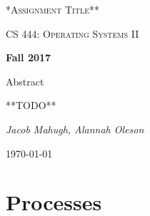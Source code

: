 \documentclass[letterpaper,10pt,titlepage]{article}
\begin{document}
\begin{titlepage}
	\centering
	\vspace*{4cm}
	{\scshape\huge **Assignment Title**\par}
	\vspace{1cm}
	{\scshape\LARGE CS 444: Operating Systems II\par}
	\vspace{0.5cm}
	{\large\bfseries Fall 2017\par}
	{\large Abstract\par}
	\vspace {0.5cm}
	**TODO**
	\par
	\vspace{1cm}
	{\Large\itshape Jacob Mahugh, Alannah Oleson\par}
	\vfill
	{\large \today\par}	

\end{titlepage}



\section{Processes}






%
%
%
\end{document}
